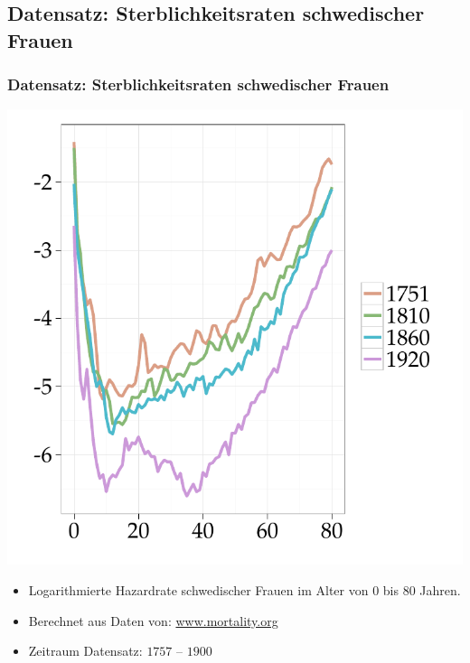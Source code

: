 \documentclass[xcolor=dvipsnames, compress, serif, professionalfont, handout]{beamer}
\newenvironment{knitrout}{}{} %
\renewenvironment{knitrout}{\begin{footnotesize}}{\end{footnotesize}}
\begin{document}
\subsection{Datensatz: Sterblichkeitsraten schwedischer Frauen}
\begin{frame}[fragile]
\frametitle{Datensatz: Sterblichkeitsraten schwedischer Frauen}


  \hspace{-0.1cm}   
  \begin{minipage}{0.48\textwidth}
\begin{knitrout}
\color{fgcolor}

{\centering \includegraphics[width=\linewidth,height=\linewidth]{figure/graphics-GR_bspmort} 

}


\end{knitrout}

  \end{minipage} 
  \hspace{0.1cm}
  \begin{minipage}{0.48\textwidth}
    \begin{itemize}
      \item<1-> Logarithmierte Hazardrate schwedischer Frauen im Alter von $0$ bis
            $80$ Jahren.
      \item<2-> Berechnet aus Daten von: \url{www.mortality.org} 
      \item<3-> Zeitraum Datensatz: $1757$ -- $1900$
    \end{itemize}
  \end{minipage}
\end{frame}
\end{document}
